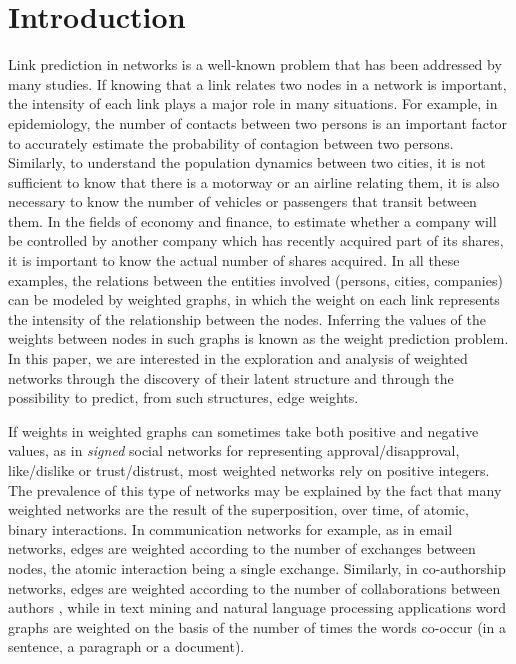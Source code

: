 \section{Introduction}

Link prediction in networks is a well-known problem that has been addressed by many studies. If knowing that a link relates two nodes in a network is important, the intensity of each link plays a major role in many situations. For example, in epidemiology, the number of contacts between two persons is an important factor to accurately estimate the probability of contagion between two persons. Similarly, to understand the population dynamics between two cities, it is not sufficient to know that there is a motorway or an airline relating them, it is also necessary to know the number of vehicles or passengers that transit between them. In the fields of economy and finance, to estimate whether a company will be controlled by another company which has recently acquired part of its shares, it is important to know the actual number of shares acquired. In all these examples, the relations between the entities involved (persons, cities, companies) can be modeled by weighted graphs, in which the weight on each link represents the intensity of the relationship between the nodes. Inferring the values of the weights between nodes in such graphs is known as the weight prediction problem. In this paper, we are interested in the exploration and analysis of weighted networks through the discovery of their latent structure and through the possibility to predict, from such structures, edge weights. 

If weights in weighted graphs can sometimes take both positive and negative values, as in \textit{signed} social networks for representing approval/disapproval, like/dislike or trust/distrust, most weighted networks rely on positive integers. The prevalence of this type of networks may be explained by the fact that many weighted networks are the result of the superposition, over time, of atomic, binary interactions. In communication networks for example, as in email networks, edges are weighted according to the number of exchanges between nodes, the atomic interaction being a single exchange. Similarly, in co-authorship networks, edges are weighted according to the number of collaborations between authors \cite{newman2001scientific}, while in text mining and natural language processing applications word graphs are weighted on the basis of the number of times the words co-occur (in a sentence, a paragraph or a document).

